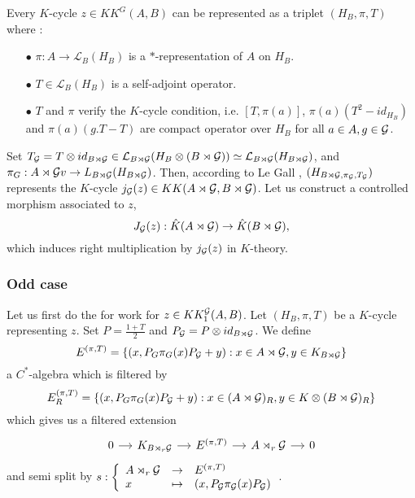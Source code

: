 Every $K$-cycle $z\in KK^G(A,B)$ can be represented as a triplet $(H_B, \pi, T)$ where :
\begin{itemize}
\item[$\bullet$]$\pi : A\rightarrow \mathcal L_B(H_B)$ is a $*$-representation of $A$ on $H_B$.
\item[$\bullet$]$T\in \mathcal L_B(H_B)$ is a self-adjoint operator.
\item[$\bullet$] $T$ and $\pi$ verify the $K$-cycle condition, i.e. $[T,\pi(a)]$, $\pi(a)(T^2-id_{H_B})$ and $\pi(a)(g.T-T)$ are compact operator over $H_B$ for all $a\in A, g\in \mathcal G$.\\
\end{itemize}

Set $T_\mathcal G= T\otimes id_{B\rtimes \mathcal G}\in \mathcal L_{B\rtimes \mathcal G}(H_B\otimes (B\rtimes \mathcal G))\simeq \mathcal L_{B\rtimes \mathcal G}(H_{B\rtimes\mathcal G})$, and $\pi_G: A\rtimes \mathcal G v\rightarrow L_{B\rtimes \mathcal G}(H_{B\rtimes\mathcal G})$. Then, according to Le Gall \cite{LeGall}, $(H_{B\rtimes\mathcal G, \pi_\mathcal G, T_\mathcal G})$ represents the $K$-cycle $j_\mathcal G(z)\in KK(A\rtimes \mathcal G,B\rtimes \mathcal G)$. Let us construct a controlled morphism associated to $z$,
\[J_\mathcal G(z) : \hat K(A\rtimes \mathcal G)\rightarrow \hat K(B\rtimes\mathcal G), \]
which induces right multiplication by $j_\mathcal G(z)$ in $K$-theory.\\

\subsubsection{Odd case}

Let us first do the for work for $z\in KK_1^\mathcal G(A,B)$. Let $(H_B,\pi,T)$ be a $K$-cycle representing $z$. Set $P=\frac{1+T}{2}$ and $P_\mathcal G=P\otimes id_{B\rtimes \mathcal G}$. We define
\[E^{(\pi,T)}=\{(x,P_G\pi_G(x)P_\mathcal G + y) : x\in A\rtimes \mathcal G, y\in K_{B\rtimes\mathcal G}\}\]
a $C^*$-algebra which is filtered by
\[E_R^{(\pi,T)}=\{(x,P_G\pi_G(x)P_\mathcal G + y) : x\in (A\rtimes \mathcal G)_R, y\in K\otimes (B\rtimes\mathcal G)_R\}\]
which gives us a filtered extension
\[\begin{tikzcd}[column sep = small]
0\arrow{r} & K_{B\rtimes_r\G}\arrow{r} & E^{(\pi,T)} \arrow{r} & A\rtimes_r \G \arrow{r}& 0
\end{tikzcd}\]
and semi split by  $s :\left\{\begin{array}{lll}A\rtimes_r \mathcal G & \rightarrow & E^{(\pi,T)} \\ x & \mapsto & (x, P_\mathcal G \pi_\mathcal G(x)P_\mathcal G)\end{array}\right.$.\\

